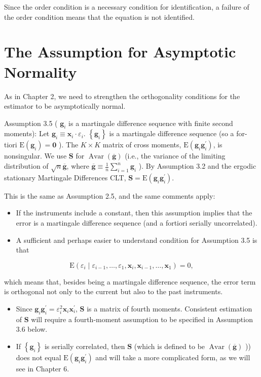 \documentclass[10pt]{article}
\begin{document}
Since the order condition is a necessary condition for identification, a failure of the order condition means that the equation is not identified.

\section*{The Assumption for Asymptotic Normality}
As in Chapter 2, we need to strengthen the orthogonality conditions for the estimator to be asymptotically normal.

Assumption 3.5 ( $\mathbf{g}_{i}$ is a martingale difference sequence with finite second moments): Let $\mathbf{g}_{i} \equiv \mathbf{x}_{i} \cdot \varepsilon_{i}$. $\left\{\mathbf{g}_{i}\right\}$ is a martingale difference sequence (so a for-\\
tiori $\mathrm{E}\left(\mathbf{g}_{i}\right)=\mathbf{0}$ ). The $K \times K$ matrix of cross moments, $\mathrm{E}\left(\mathbf{g}_{i} \mathbf{g}_{i}^{\prime}\right)$, is nonsingular. We use $\mathbf{S}$ for $\operatorname{Avar}(\overline{\mathbf{g}})$ (i.e., the variance of the limiting distribution of $\sqrt{n} \overline{\mathbf{g}}$, where $\overline{\mathbf{g}} \equiv \frac{1}{n} \sum_{i=1}^{n} \mathbf{g}_{i}$ ). By Assumption 3.2 and the ergodic stationary Martingale Differences CLT, $\mathbf{S}=\mathrm{E}\left(\mathbf{g}_{i} \mathbf{g}_{i}^{\prime}\right)$.

This is the same as Assumption 2.5, and the same comments apply:

\begin{itemize}
  \item If the instruments include a constant, then this assumption implies that the error is a martingale difference sequence (and a fortiori serially uncorrelated).
  \item A sufficient and perhaps easier to understand condition for Assumption 3.5 is that
\end{itemize}


\begin{equation*}
\mathrm{E}\left(\varepsilon_{i} \mid \varepsilon_{i-1}, \ldots, \varepsilon_{1}, \mathbf{x}_{i}, \mathbf{x}_{i-1}, \ldots, \mathbf{x}_{1}\right)=0, \tag{3.3.6}
\end{equation*}


which means that, besides being a martingale difference sequence, the error term is orthogonal not only to the current but also to the past instruments.

\begin{itemize}
  \item Since $\mathbf{g}_{i} \mathbf{g}_{i}^{\prime}=\varepsilon_{i}^{2} \mathbf{x}_{i} \mathbf{x}_{i}^{\prime}$, $\mathbf{S}$ is a matrix of fourth moments. Consistent estimation of $\mathbf{S}$ will require a fourth-moment assumption to be specified in Assumption 3.6 below.
  \item If $\left\{\mathbf{g}_{i}\right\}$ is serially correlated, then $\mathbf{S}$ (which is defined to be $\operatorname{Avar}(\overline{\mathbf{g}})$ )) does not equal $\mathrm{E}\left(\mathbf{g}_{i} \mathbf{g}_{i}^{\prime}\right)$ and will take a more complicated form, as we will see in Chapter 6.
\end{itemize}
\end{document}
